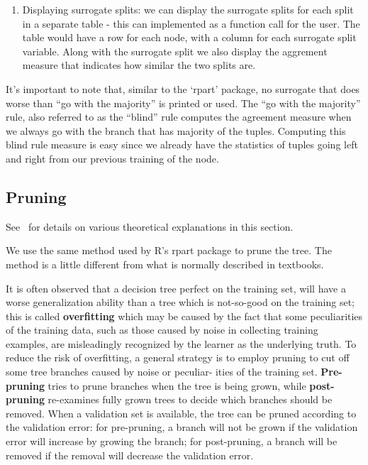 \begin{enumerate}
    \item Displaying surrogate splits: we can display the surrogate splits for
    each split in a separate table - this can implemented as a function call
    for the user. The table would have a row for each node, with a column for
    each surrogate split variable. Along with the surrogate split we also display
    the aggrement measure that indicates how similar the two splits are.
\end{enumerate}

It's important to note that, similar to the `rpart' package, no surrogate that
does worse than ``go with the majority'' is printed or used. The ``go with the majority''
rule, also referred to as the ``blind'' rule computes the agreement measure when
we always go with the branch that has majority of the tuples. Computing this
blind rule measure is easy since we already have the statistics of tuples
going left and right from our previous training of the node.


\subsection{Pruning} %
\label{sub:pruning}

See~\cite{hastie2008statisticallearning} for details on various
theoretical explanations in this section.

We use the same method used by R's rpart package to prune the tree.
The method is a little different from what is normally described in
textbooks.

It is often observed that a decision tree perfect on the training set,
will have a worse generalization ability than a tree which is
not-so-good on the training set; this is called \textbf{overfitting}
which may be caused by the fact that some peculiarities of the
training data, such as those caused by noise in collecting training
examples, are misleadingly recognized by the learner as the underlying
truth. To reduce the risk of overfitting, a general strategy is to
employ pruning to cut off some tree branches caused by noise or
peculiar- ities of the training set. \textbf{Pre-pruning} tries to
prune branches when the tree is being grown, while
\textbf{post-pruning} re-examines fully grown trees to decide which
branches should be removed. When a validation set is available, the
tree can be pruned according to the validation error: for pre-pruning,
a branch will not be grown if the validation error will increase by
growing the branch; for post-pruning, a branch will be removed if the
removal will decrease the validation error.

